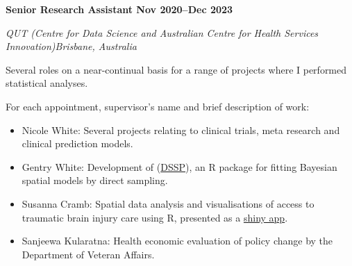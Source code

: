 
\textbf{Senior Research Assistant \hfill Nov 2020--Dec 2023}\par
\textit{QUT (Centre for Data Science and Australian Centre for Health Services Innovation)\hfill Brisbane, Australia}\par
Several roles on a near-continual basis for a range of projects where I performed statistical analyses.\par
For each appointment, supervisor's name and brief description of work:\par
\begin{itemize}
	\item Nicole White: Several projects relating to clinical trials, meta research and clinical prediction models.
    \item Gentry White: Development of (\href{https://cran.r-project.org/web/packages/DSSP/index.html}{DSSP}), an R package for fitting Bayesian spatial models by direct sampling.
	\item Susanna Cramb: Spatial data analysis and visualisations of access to traumatic brain injury care using R, presented as a \href{https://github.com/RWParsons/iTRAQI_app/}{shiny app}.
	\item Sanjeewa Kularatna: Health economic evaluation of policy change by the Department of Veteran Affairs.
\end{itemize}\par
